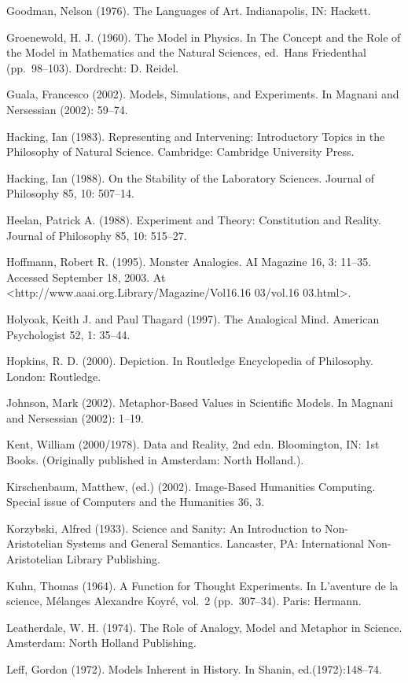 Goodman, Nelson (1976). The Languages of Art. Indianapolis, IN: Hackett.

Groenewold, H. J. (1960). The Model in Physics. In The Concept and the
Role of the Model in Mathematics and the Natural Sciences, ed.~Hans
Friedenthal (pp.~98--103). Dordrecht: D. Reidel.

Guala, Francesco (2002). Models, Simulations, and Experiments. In
Magnani and Nersessian (2002): 59--74.

Hacking, Ian (1983). Representing and Intervening: Introductory Topics
in the Philosophy of Natural Science. Cambridge: Cambridge University
Press.

Hacking, Ian (1988). On the Stability of the Laboratory Sciences.
Journal of Philosophy 85, 10: 507--14.

Heelan, Patrick A. (1988). Experiment and Theory: Constitution and
Reality. Journal of Philosophy 85, 10: 515--27.

Hoffmann, Robert R. (1995). Monster Analogies. AI Magazine 16, 3:
11--35. Accessed September 18, 2003. At
\textless http://www.aaai.org.Library/Magazine/Vol16.16 03/vol.16
03.html\textgreater.

Holyoak, Keith J. and Paul Thagard (1997). The Analogical Mind. American
Psychologist 52, 1: 35--44.

Hopkins, R. D. (2000). Depiction. In Routledge Encyclopedia of
Philosophy. London: Routledge.

Johnson, Mark (2002). Metaphor-Based Values in Scientific Models. In
Magnani and Nersessian (2002): 1--19.

Kent, William (2000/1978). Data and Reality, 2nd edn. Bloomington, IN:
1st Books. (Originally published in Amsterdam: North Holland.).

Kirschenbaum, Matthew, (ed.) (2002). Image-Based Humanities Computing.
Special issue of Computers and the Humanities 36, 3.

Korzybski, Alfred (1933). Science and Sanity: An Introduction to
Non-Aristotelian Systems and General Semantics. Lancaster, PA:
International Non-Aristotelian Library Publishing.

Kuhn, Thomas (1964). A Function for Thought Experiments. In L'aventure
de la science, Mélanges Alexandre Koyré, vol.~2 (pp.~307--34). Paris:
Hermann.

Leatherdale, W. H. (1974). The Role of Analogy, Model and Metaphor in
Science. Amsterdam: North Holland Publishing.

Leff, Gordon (1972). Models Inherent in History. In Shanin,
ed.(1972):148--74.

